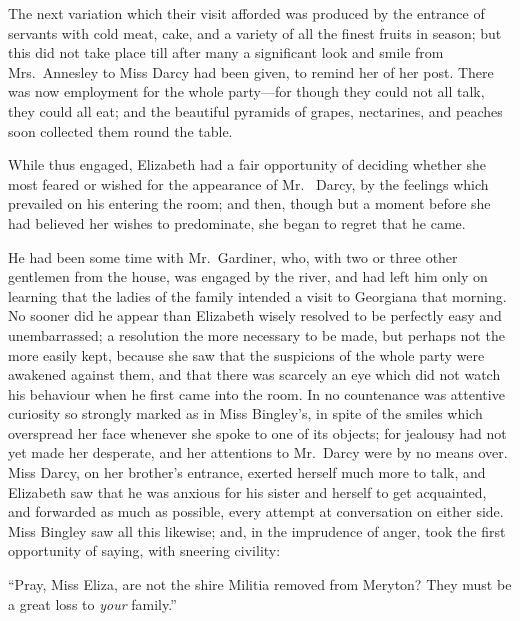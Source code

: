 The next variation which their visit afforded was produced by
the entrance of servants with cold meat, cake, and a variety of
all the finest fruits in season; but this did not take place till
after many a significant look and smile from Mrs.\ Annesley to
Miss Darcy had been given, to remind her of her post.  There was
now employment for the whole party---for though they could not all
talk, they could all eat; and the beautiful pyramids of grapes,
nectarines, and peaches soon collected them round the table.

While thus engaged, Elizabeth had a fair opportunity of deciding
whether she most feared or wished for the appearance of Mr.\ %
Darcy, by the feelings which prevailed on his entering the room;
and then, though but a moment before she had believed her
wishes to predominate, she began to regret that he came.

He had been some time with Mr.\ Gardiner, who, with two or
three other gentlemen from the house, was engaged by the river,
and had left him only on learning that the ladies of the family
intended a visit to Georgiana that morning.  No sooner did he
appear than Elizabeth wisely resolved to be perfectly easy and
unembarrassed; a resolution the more necessary to be made, but
perhaps not the more easily kept, because she saw that the
suspicions of the whole party were awakened against them, and
that there was scarcely an eye which did not watch his
behaviour when he first came into the room.  In no countenance
was attentive curiosity so strongly marked as in Miss Bingley's,
in spite of the smiles which overspread her face whenever she
spoke to one of its objects; for jealousy had not yet made her
desperate, and her attentions to Mr.\ Darcy were by no means
over.  Miss Darcy, on her brother's entrance, exerted herself
much more to talk, and Elizabeth saw that he was anxious for
his sister and herself to get acquainted, and forwarded as much
as possible, every attempt at conversation on either side.  Miss
Bingley saw all this likewise; and, in the imprudence of anger,
took the first opportunity of saying, with sneering civility:

``Pray, Miss Eliza, are not the \gdash{}shire Militia removed from
Meryton?  They must be a great loss to \emph{your} family.''

